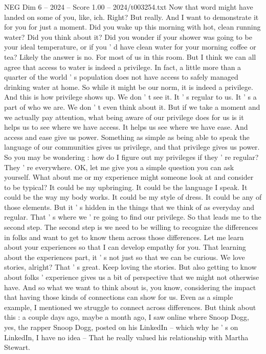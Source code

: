 \begin{textsample}{NEG Dim 6 – 2024 – Score 1.00 – 2024/t003254.txt}
Now that word might have landed on some of you, like, ich.
Right?
But really.
And I want to demonstrate it for you for just a moment.
Did you wake up this morning with hot, clean running water?
Did you think about it?
Did you wonder if your shower was going to be your ideal temperature, or if you ' d have clean water for your morning coffee or tea?
Likely the answer is no.
For most of us in this room.
But I think we can all agree that access to water is indeed a privilege.
In fact, a little more than a quarter of the world ' s population does not have access to safely managed drinking water at home.
So while it might be our norm, it is indeed a privilege.
And this is how privilege shows up.
We don ' t see it.
It ' s regular to us.
It ' s a part of who we are.
We don ' t even think about it.
But if we take a moment and we actually pay attention, what being aware of our privilege does for us is it helps us to see where we have access.
It helps us see where we have ease.
And access and ease give us power.
Something as simple as being able to speak the language of our communities gives us privilege, and that privilege gives us power.
So you may be wondering : how do I figure out my privileges if they ' re regular?
They ' re everywhere.
OK, let me give you a simple question you can ask yourself.
What about me or my experience might someone look at and consider to be typical?
It could be my upbringing.
It could be the language I speak.
It could be the way my body works.
It could be my style of dress.
It could be any of those elements.
But it ' s hidden in the things that we think of as everyday and regular.
That ' s where we ' re going to find our privilege.
So that leads me to the second step.
The second step is we need to be willing to recognize the differences in folks and want to get to know them across those differences.
Let me learn about your experiences so that I can develop empathy for you.
That learning about the experiences part, it ' s not just so that we can be curious.
We love stories, alright?
That ' s great.
Keep loving the stories.
But also getting to know about folks ' experience gives us a bit of perspective that we might not otherwise have.
And so what we want to think about is, you know, considering the impact that having those kinds of connections can show for us.
Even as a simple example, I mentioned we struggle to connect across differences.
But think about this : a couple days ago, maybe a month ago, I saw online where Snoop Dogg, yes, the rapper Snoop Dogg, posted on his LinkedIn -- which why he ' s on LinkedIn, I have no idea -- That he really valued his relationship with Martha Stewart.

\end{textsample}
